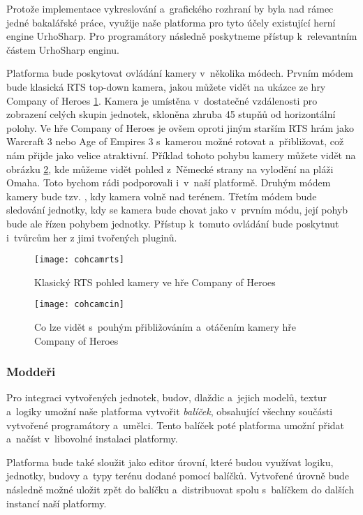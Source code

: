 Protože implementace vykreslování a~grafického rozhraní by byla nad rámec jedné bakalářské práce, využije naše platforma pro tyto účely existující herní engine UrhoSharp. Pro programátory následně  poskytneme přístup k~relevantním částem UrhoSharp enginu.

Platforma bude poskytovat ovládání kamery v~několika módech. Prvním módem bude klasická RTS top-down kamera, jakou můžete vidět na ukázce ze hry Company of Heroes \ref{fig:cohcamrts}. Kamera je umístěna v~dostatečné vzdálenosti pro zobrazení celých skupin jednotek, skloněna zhruba 45 stupňů od horizontální polohy.  Ve hře Company of Heroes je ovšem oproti jiným starším RTS hrám jako Warcraft 3 nebo Age of Empires 3 s~kamerou možné rotovat a~přibližovat, což nám přijde jako velice atraktivní. Příklad tohoto pohybu kamery můžete vidět na obrázku \ref{fig:cohcamcin}, kde můžeme vidět pohled z~Německé strany na vylodění na pláži Omaha. Toto bychom rádi podporovali i~v~naší platformě. Druhým módem kamery bude tzv.  , kdy kamera volně   nad terénem. Třetím módem bude sledování jednotky, kdy se kamera bude chovat jako v~prvním módu, její pohyb bude ale řízen pohybem jednotky. Přístup k~tomuto ovládání bude poskytnut i~tvůrcům her z jimi tvořených pluginů.

\begin{figure}[h]	
	\centering
	\texttt{[image: cohcamrts]}
	\caption{Klasický RTS pohled kamery ve hře Company of Heroes}
	\label{fig:cohcamrts}
\end{figure}

\begin{figure}[h]	
	\centering
	\texttt{[image: cohcamcin]}
	\caption{Co lze vidět s~pouhým přibližováním a~otáčením kamery hře Company of Heroes}
	\label{fig:cohcamcin}
\end{figure}

\subsubsection{Moddeři}

Pro integraci vytvořených jednotek, budov, dlaždic a~jejich modelů, textur a~logiky umožní naše platforma vytvořit \emph{balíček}, obsahující všechny součásti vytvořené programátory a~umělci.  Tento balíček poté platforma umožní přidat a~načíst v~libovolné instalaci platformy.

Platforma bude také sloužit jako editor úrovní, které budou využívat logiku, jednotky, budovy a~typy terénu dodané pomocí balíčků. Vytvořené úrovně bude následně možné uložit zpět do balíčku a~distribuovat spolu s~balíčkem do dalších instancí naší platformy.

